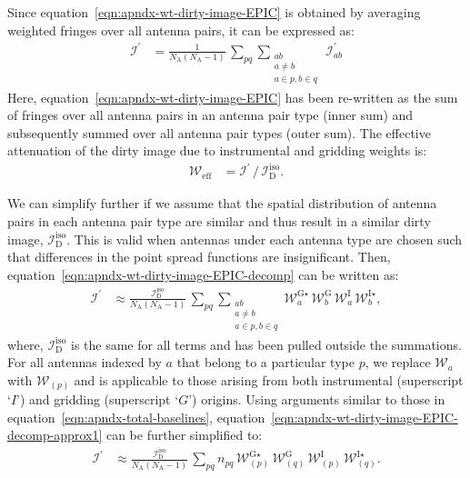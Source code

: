 \documentclass[a4paper,fleqn,usenatbib]{mnras}
\newcommand{\Nant}{N_\textrm{A}}
\begin{document}
Since equation~\ref{eqn:apndx-wt-dirty-image-EPIC} is obtained by averaging weighted fringes over all antenna pairs, it can be expressed as: 
\begin{align}\label{eqn:apndx-wt-dirty-image-EPIC-decomp}
  \mathcal{I}^\prime &= \frac{1}{\Nant(\Nant-1)}\,\sum_{pq}\sum_{\substack{ab\\a\ne b\\a\in p, b\in q}}\,\mathcal{I}^\prime_{ab}
\end{align}
Here, equation~\ref{eqn:apndx-wt-dirty-image-EPIC} has been re-written as the sum of fringes over all antenna pairs in an antenna pair type (inner sum) and subsequently summed over all antenna pair types (outer sum). The effective attenuation of the dirty image due to instrumental and gridding weights is:
\begin{align}\label{eqn:apndx-effective-weighting}
  \mathcal{W}_\textrm{eff} &= \mathcal{I}^\prime\, / \,\mathcal{I}_\textrm{D}^\textrm{iso}.
\end{align}

We can simplify further if we assume that the spatial distribution of antenna pairs in each antenna pair type are similar and thus result in a similar dirty image, $\mathcal{I}_\textrm{D}^\textrm{iso}$. This is valid when antennas under each antenna type are chosen such that differences in the point spread functions are insignificant. Then, equation~\ref{eqn:apndx-wt-dirty-image-EPIC-decomp} can be written as:
\begin{align}\label{eqn:apndx-wt-dirty-image-EPIC-decomp-approx1}
  \mathcal{I}^\prime &\approx \frac{\mathcal{I}_\textrm{D}^\textrm{iso}}{\Nant(\Nant-1)}\,\sum_{pq}\sum_{\substack{ab\\a\ne b\\a\in p, b\in q}} \mathcal{W}^{\textrm{G}\star}_a\,\mathcal{W}^\textrm{G}_b\,\mathcal{W}^\textrm{I}_a\,\mathcal{W}^{\textrm{I}\star}_b,
\end{align}
where, $\mathcal{I}_\textrm{D}^\textrm{iso}$ is the same for all terms and has been pulled outside the summations. For all antennas indexed by $a$ that belong to a particular type $p$, we replace $\mathcal{W}_a$ with $\mathcal{W}_{(p)}$ and is applicable to those arising from both instrumental (superscript `$I$') and gridding (superscript `$G$') origins. Using arguments similar to those in equation~\ref{eqn:apndx-total-baselines}, equation~\ref{eqn:apndx-wt-dirty-image-EPIC-decomp-approx1} can be further simplified to:
\begin{align}\label{eqn:apndx-wt-dirty-image-EPIC-decomp-approx2}
  \mathcal{I}^\prime &\approx \frac{\mathcal{I}_\textrm{D}^\textrm{iso}}{\Nant(\Nant-1)}\,\sum_{pq}n_{pq}\,\mathcal{W}^{\textrm{G}\star}_{(p)}\,\mathcal{W}^\textrm{G}_{(q)}\,\mathcal{W}^\textrm{I}_{(p)}\,\mathcal{W}^{\textrm{I}\star}_{(q)}.
\end{align}
\end{document}
